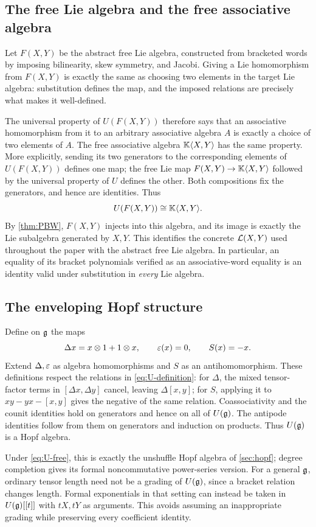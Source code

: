 \subsection{The free Lie algebra and the free associative algebra}
Let $F(X,Y)$ be the abstract free Lie algebra, constructed from bracketed words by imposing bilinearity, skew symmetry, and Jacobi. Giving a Lie homomorphism from $F(X,Y)$ is exactly the same as choosing two elements in the target Lie algebra: substitution defines the map, and the imposed relations are precisely what makes it well-defined.

The universal property of $U(F(X,Y))$ therefore says that an associative homomorphism from it to an arbitrary associative algebra $A$ is exactly a choice of two elements of $A$. The free associative algebra $\mathbb K\langle X,Y\rangle$ has the same property. More explicitly, sending its two generators to the corresponding elements of $U(F(X,Y))$ defines one map; the free Lie map $F(X,Y)\to\mathbb K\langle X,Y\rangle$ followed by the universal property of $U$ defines the other. Both compositions fix the generators, and hence are identities. Thus
\begin{equation}\label{eq:U-free}
 U(F(X,Y))\cong\mathbb K\langle X,Y\rangle.
\end{equation}
By \cref{thm:PBW}, $F(X,Y)$ injects into this algebra, and its image is exactly the Lie subalgebra generated by $X,Y$. This identifies the concrete $\mathcal L(X,Y)$ used throughout the paper with the abstract free Lie algebra. In particular, an equality of its bracket polynomials verified as an associative-word equality is an identity valid under substitution in \emph{every} Lie algebra.

\subsection{The enveloping Hopf structure}
Define on $\mathfrak g$ the maps
\begin{equation}\label{eq:U-Hopf}
 \Delta x=x\otimes1+1\otimes x,\qquad
 \varepsilon(x)=0,\qquad S(x)=-x.
\end{equation}
Extend $\Delta,\varepsilon$ as algebra homomorphisms and $S$ as an antihomomorphism. These definitions respect the relations in \cref{eq:U-definition}: for $\Delta$, the mixed tensor-factor terms in $[\Delta x,\Delta y]$ cancel, leaving $\Delta[x,y]$; for $S$, applying it to $xy-yx-[x,y]$ gives the negative of the same relation. Coassociativity and the counit identities hold on generators and hence on all of $U(\mathfrak g)$. The antipode identities follow from them on generators and induction on products. Thus $U(\mathfrak g)$ is a Hopf algebra.

Under \cref{eq:U-free}, this is exactly the unshuffle Hopf algebra of \cref{sec:hopf}; degree completion gives its formal noncommutative power-series version. For a general $\mathfrak g$, ordinary tensor length need not be a grading of $U(\mathfrak g)$, since a bracket relation changes length. Formal exponentials in that setting can instead be taken in $U(\mathfrak g)[[t]]$ with $tX,tY$ as arguments. This avoids assuming an inappropriate grading while preserving every coefficient identity.
